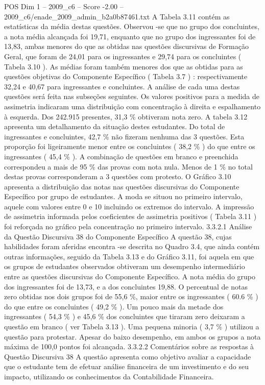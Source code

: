\begin{textsample}{POS Dim 1 – 2009\_c6 – Score -2.00 – 2009\_c6/enade\_2009\_admin\_b2a0b87461.txt}
A Tabela 3.11 contém as estatísticas da média destas questões.
Observou -se que no grupo dos concluintes, a nota média alcançada foi 19,71, enquanto que no grupo dos ingressantes foi de 13,83, ambas menores do que as obtidas nas questões discursivas de Formação Geral, que foram de 24,01 para os ingressantes e 29,74 para os concluintes ( Tabela 3.10 ).
As médias foram também menores dos que as obtidas para as questões objetivas do Componente Específico ( Tabela 3.7 ) : respectivamente 32,24 e 40,67 para ingressantes e concluintes.
A análise de cada uma destas questões será feita nas subseções seguintes.
Os valores positivos para a medida de assimetria indicaram uma distribuição com concentração à direita e espalhamento à esquerda.
Dos 242.915 presentes, 31,3 \% obtiveram nota zero.
A tabela 3.12 apresenta um detalhamento da situação destes estudantes.
Do total de ingressantes e concluintes, 42,7 \% não fizeram nenhuma das 3 questões.
Esta proporção foi ligeiramente menor entre os concluintes ( 38,2 \% ) do que entre os ingressantes ( 45,4 \% ).
A combinação de questões em branco e preenchida correspondeu a mais de 95 \% das provas com nota nula.
Menos de 1 \% no total destas provas corresponderam a 3 questões com protesto.
O Gráfico 3.10 apresenta a distribuição das notas nas questões discursivas do Componente Específico por grupo de estudantes.
A moda se situou no primeiro intervalo, aquele com valores entre 0 e 10 incluindo os extremos do intervalo.
A impressão de assimetria informada pelos coeficientes de assimetria positivos ( Tabela 3.11 ) foi reforçada no gráfico pela concentração no primeiro intervalo. 3.3.2.1 Análise da Questão Discursiva 38 do Componente Específico A questão 38, cujas habilidades foram aferidas encontra -se descrita no Quadro 3.4, que ainda contém outras informações, seguido da Tabela 3.13 e do Gráfico 3.11, foi aquela em que os grupos de estudantes observados obtiveram um desempenho intermediário entre as questões discursivas do Componente Específico.
A nota média do grupo dos ingressantes foi de 13,73, e a dos concluintes 19,88.
O percentual de notas zero obtidas nos dois grupos foi de 55,6 \%, maior entre os ingressantes ( 60.6 \% ) do que entre os concluintes ( 49,2 \% ).
Um pouco mais da metade dos ingressantes ( 54,3 \% ) e 45,6 \% dos concluintes que tiraram zero deixaram a questão em branco ( ver Tabela 3.13 ).
Uma pequena minoria ( 3,7 \% ) utilizou a questão para protestar.
Apesar do baixo desempenho, em ambos os grupos a nota máxima de 100,0 pontos foi alcançada. 3.3.2.2 Comentários sobre as respostas à Questão Discursiva 38 A questão apresenta como objetivo avaliar a capacidade que o estudante tem de efetuar análise financeira de um investimento e do seu impacto, utilizando os conhecimentos da Contabilidade Financeira.

\end{textsample}
